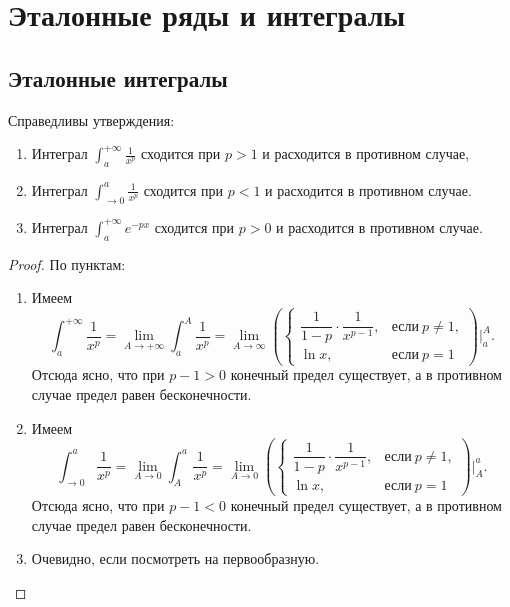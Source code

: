 \appendix

\section{Эталонные ряды и интегралы}

\subsection{Эталонные интегралы}

\begin{lemma} \hypertarget{etint}{}
	Справедливы утверждения:
	\begin{enumerate}
		\item Интеграл \(\displaystyle \int_a^{+\infty} \frac{1}{x^p}\) сходится при \(p > 1\) и расходится в противном случае,
		\item Интеграл \(\displaystyle \int_{\to 0}^a \frac{1}{x^p}\) сходится при \(p < 1\) и расходится в противном случае.
		\item Интеграл \(\displaystyle \int_a^{+\infty} e^{-p x}\) сходится при \(p > 0\) и расходится в противном случае.
	\end{enumerate}
	
\end{lemma}
\begin{proof}
	По пунктам:
	\begin{enumerate}
		\item Имеем \[
		\int_a^{+\infty} \frac{1}{x^p} = \lim_{A \to +\infty} \int_a^A \frac{1}{x^p} = \lim_{A 	\to \infty} \left(
		\begin{cases}
			\dfrac{1}{1 - p} \cdot \dfrac{1}{x^{p - 1}}, &\text{если} \ p \neq 1, \\
			\ln x, 									   &\text{если} \ p = 1
		\end{cases}
		\right) \bigg|_a^A.
		\]
		Отсюда ясно, что при \(p - 1 > 0\) конечный предел существует, а в противном случае предел равен бесконечности.
		\item Имеем \[
		\int_{\to 0}^a \frac{1}{x^p} = \lim_{A \to 0} \int_A^a \frac{1}{x^p} = \lim_{A 	\to 0} \left(
		\begin{cases}
			\dfrac{1}{1 - p} \cdot \dfrac{1}{x^{p - 1}}, &\text{если} \ p \neq 1, \\
			\ln x, 									   &\text{если} \ p = 1
		\end{cases}
		\right) \bigg|_A^a.
		\]
		Отсюда ясно, что при \(p - 1 < 0\) конечный предел существует, а в противном случае предел равен бесконечности.
		\item Очевидно, если посмотреть на первообразную.
	\end{enumerate}
\end{proof}

